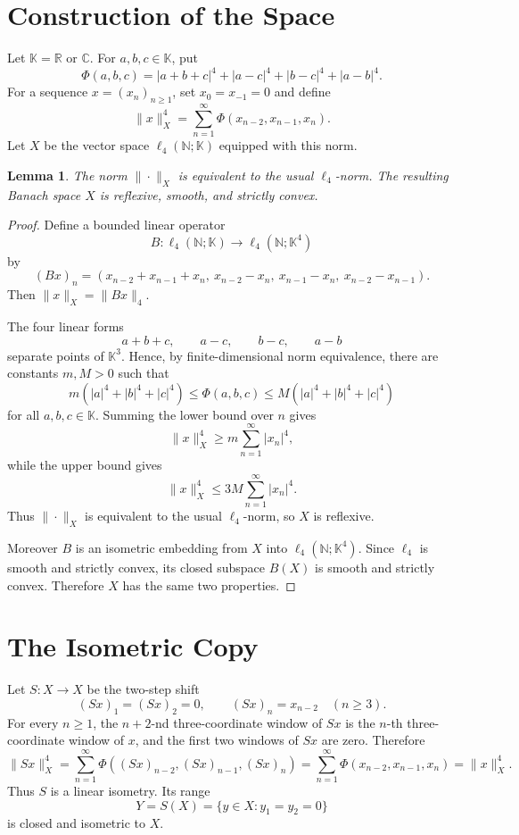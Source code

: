 \documentclass[11pt]{article}
\newtheorem{lemma}{Lemma}
\newcommand{\K}{\mathbb K}
\newcommand{\R}{\mathbb R}
\newcommand{\C}{\mathbb C}
\newcommand{\N}{\mathbb N}
\begin{document}
\section*{Construction of the Space}

Let \(\K=\R\) or \(\C\).  For \(a,b,c\in\K\), put
\[
 \Phi(a,b,c)
   = |a+b+c|^4+|a-c|^4+|b-c|^4+|a-b|^4 .
\]
For a sequence \(x=(x_n)_{n\ge 1}\), set \(x_0=x_{-1}=0\) and define
\[
   \|x\|_X^4
     = \sum_{n=1}^\infty \Phi(x_{n-2},x_{n-1},x_n).
\]
Let \(X\) be the vector space \(\ell_4(\N;\K)\) equipped with this norm.

\begin{lemma}\label{lem:norm}
The norm \(\|\cdot\|_X\) is equivalent to the usual \(\ell_4\)-norm.  The
resulting Banach space \(X\) is reflexive, smooth, and strictly convex.
\end{lemma}

\begin{proof}
Define a bounded linear operator
\[
   B:\ell_4(\N;\K)\longrightarrow \ell_4(\N;\K^4)
\]
by
\[
 (Bx)_n=(x_{n-2}+x_{n-1}+x_n,\ x_{n-2}-x_n,\ x_{n-1}-x_n,\ x_{n-2}-x_{n-1}).
\]
Then \(\|x\|_X=\|Bx\|_4\).

The four linear forms
\[
 a+b+c,\qquad a-c,\qquad b-c,\qquad a-b
\]
separate points of \(\K^3\).  Hence, by finite-dimensional norm equivalence,
there are constants \(m,M>0\) such that
\[
   m(|a|^4+|b|^4+|c|^4)
     \le \Phi(a,b,c)
     \le M(|a|^4+|b|^4+|c|^4)
\]
for all \(a,b,c\in\K\).  Summing the lower bound over \(n\) gives
\[
   \|x\|_X^4 \ge m\sum_{n=1}^\infty |x_n|^4,
\]
while the upper bound gives
\[
   \|x\|_X^4 \le 3M\sum_{n=1}^\infty |x_n|^4.
\]
Thus \(\|\cdot\|_X\) is equivalent to the usual \(\ell_4\)-norm, so \(X\) is
reflexive.

Moreover \(B\) is an isometric embedding from \(X\) into \(\ell_4(\N;\K^4)\).
Since \(\ell_4\) is smooth and strictly convex, its closed subspace
\(B(X)\) is smooth and strictly convex.  Therefore \(X\) has the same two
properties.
\end{proof}

\section*{The Isometric Copy}

Let \(S:X\to X\) be the two-step shift
\[
   (Sx)_1=(Sx)_2=0,\qquad (Sx)_n=x_{n-2}\quad(n\ge 3).
\]
For every \(n\ge 1\), the \(n+2\)-nd three-coordinate window of \(Sx\) is the
\(n\)-th three-coordinate window of \(x\), and the first two windows of
\(Sx\) are zero.  Therefore
\[
   \|Sx\|_X^4
      = \sum_{n=1}^\infty \Phi((Sx)_{n-2},(Sx)_{n-1},(Sx)_n)
      = \sum_{n=1}^\infty \Phi(x_{n-2},x_{n-1},x_n)
      = \|x\|_X^4.
\]
Thus \(S\) is a linear isometry.  Its range
\[
   Y=S(X)=\{y\in X:y_1=y_2=0\}
\]
is closed and isometric to \(X\).
\end{document}
